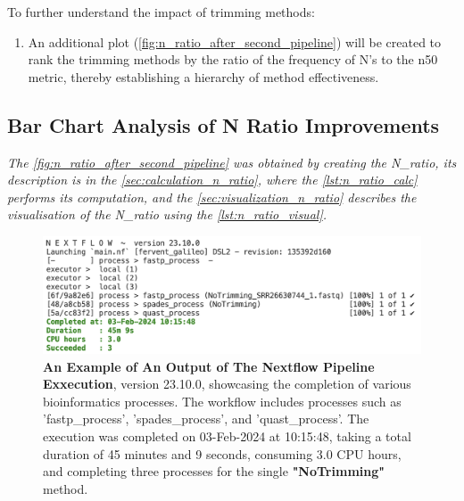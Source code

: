 To further understand the impact of \gls{trimming} methods:
\begin{enumerate}
  \item An additional plot (\autoref{fig:n_ratio_after_second_pipeline}) will be created to rank the \gls{trimming} methods by the ratio of the frequency of N's to the \gls{n50} metric, thereby establishing a hierarchy of method effectiveness.
\end{enumerate}

\subsection{Bar Chart Analysis of N Ratio Improvements} 

\textit{The \autoref{fig:n_ratio_after_second_pipeline} was obtained by creating the N\_ratio, its description is in the  \autoref{sec:calculation_n_ratio}, where the \autoref{lst:n_ratio_calc} performs its computation, and the \autoref{sec:visualization_n_ratio} describes the visualisation of the N\_ratio using the  \autoref{lst:n_ratio_visual}.}

\begin{figure}[h!]
\centering
\includegraphics[width=\linewidth]{resources/images/nextflow_output.png}
\caption{\textbf{An Example of An Output of The Nextflow Pipeline Exxecution}, version 23.10.0, showcasing the completion of various bioinformatics processes. The workflow includes processes such as 'fastp\_process', 'spades\_process', and 'quast\_process'. The execution was completed on 03-Feb-2024 at 10:15:48, taking a total duration of 45 minutes and 9 seconds, consuming 3.0 CPU hours, and completing three processes for the single \textbf{"NoTrimming"} method.}
\label{fig:nextflow_output}
\end{figure}

